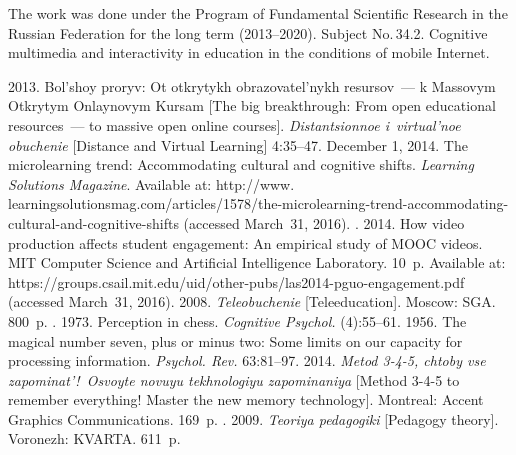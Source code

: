 \vspace*{-9pt}

\Ack
\noindent
The work was done under the Program of Fundamental Scientific Research 
in the Russian Federation for the long term (2013--2020). 
Subject No.\,34.2. Cognitive multimedia and interactivity in education 
in the conditions of mobile Internet.




  \begin{multicols}{2}

\renewcommand{\bibname}{\protect\rmfamily References}

{\small\frenchspacing
 {%
 \begin{thebibliography}{9}
 2013. Bol'shoy proryv: Ot otkrytykh obrazovatel'nykh 
resursov~--- k Massovym Otkrytym Onlaynovym Kursam [The big breakthrough: 
From open educational resources~--- to massive open online courses]. 
\textit{Distantsionnoe i~virtual'noe obuchenie} [Distance and Virtual Learning]  
4:35--47.
 December 1, 2014. The microlearning trend: Accommodating cultural and 
cognitive shifts. \textit{Learning Solutions Magazine}.  Available at: 
{\sf http://www. learningsolutionsmag.com/articles/1578/the-microlearning-trend-accommodating-cultural-and-cognitive-shifts} (accessed March~31, 2016).
. 2014. How video production affects 
student engagement: An empirical study of MOOC videos. MIT Computer 
Science and Artificial Intelligence Laboratory. 10~p. Available at: {\sf 
https://groups.csail.mit.edu/uid/other-pubs/las2014-pguo-engagement.pdf} 
(accessed March~31, 2016).
 2008. \textit{Teleobuchenie} [Teleeducation]. Moscow: 
SGA. 800~p.
. 1973. Perception in chess. 
\textit{Cognitive Psychol.} (4):55--61.
 1956. The magical number seven, plus or minus two: Some 
limits on our capacity for processing information. \textit{Psychol. Rev.} 
63:81--97.
 2014. \textit{Metod 3-4-5, chtoby vse zapominat'!\ Osvoy\-te 
novuyu tekhnologiyu zapominaniya} [Method 3-4-5 to remember everything! 
Master the new memory technology]. Montreal: Accent Graphics 
Communications. 169~p.
. 2009. \textit{Teoriya pedagogiki} 
[Pedagogy theory]. Voronezh: KVARTA.  611~p.
   \end{thebibliography}

 }
 }

\end{multicols}

